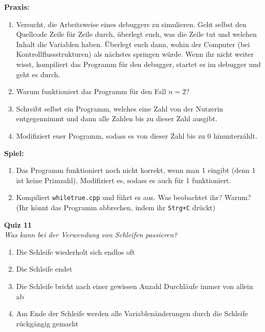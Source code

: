\textbf{Praxis:}
\begin{enumerate}
    \item Versucht, die Arbeitsweise eines debuggers zu simulieren. Geht selbst
        den Quellcode Zeile für Zeile durch, überlegt euch, was die Zeile tut
        und welchen Inhalt die Variablen haben. Überlegt euch dann, wohin der
        Computer (bei Kontrollflussstrukturen) als nächstes springen würde.
        Wenn ihr nicht weiter wisst, kompiliert das Programm für den debugger,
        startet es im debugger und geht es durch.
    \item Warum funktioniert das Programm für den Fall $n = 2$?
    \item Schreibt selbst ein Programm, welches eine Zahl von der Nutzerin
        entgegennimmt und dann alle Zahlen bis zu dieser Zahl ausgibt.
    \item Modifiziert euer Programm, sodass es von dieser Zahl bis zu 0
        hinunterzählt.
\end{enumerate}

\textbf{Spiel:}
\begin{enumerate}
    \item Das Programm funktioniert noch nicht korrekt, wenn man 1 eingibt
        (denn 1 ist keine Primzahl). Modifiziert es, sodass es auch für 1
        funktioniert.
    \item Kompiliert \texttt{whiletrue.cpp} und führt es aus. Was beobachtet
        ihr? Warum? (Ihr könnt das Programm abbrechen, indem ihr
        \texttt{Strg+C} drückt)
\end{enumerate}


\textbf{Quiz 11}\\
\textit{Was kann bei der Verwendung von Schleifen passieren?}
\begin{enumerate}[label=\alph]
    \item Die Schleife wiederholt sich endlos oft
    \item Die Schleife endet
    \item Die Schleife bricht nach einer gewissen Anzahl Durchläufe immer von allein ab
    \item Am Ende der Schleife werden alle Variablenänderungen durch die Schleife rückgängig gemacht
\end{enumerate}
